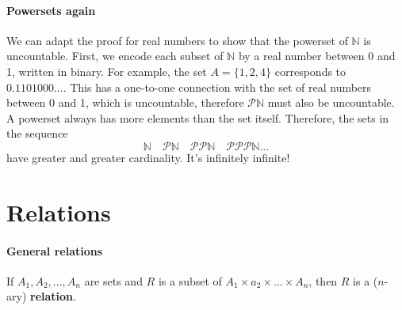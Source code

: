 \documentclass{article}
\begin{document}
\paragraph{Powersets again} We can adapt the proof for real numbers to show that the powerset of $\mathbb{N}$ is uncountable. First, we encode each subset of $\mathbb{N}$ by a real number between 0 and 1, written in binary. For example, the set $A=\{1,2,4\}$ corresponds to $0.1101000...$. This has a one-to-one connection with the set of real numbers between 0 and 1, which is uncountable, therefore $\mathscr{P}\mathbb{N}$ must also be uncountable.
\vspace{1mm}\\
A powerset always has more elements than the set itself. Therefore, the sets in the sequence
$$\mathbb{N}\quad \mathscr{P}\mathbb{N}\quad \mathscr{PP}\mathbb{N}\quad \mathscr{PPP}\mathbb{N}...$$
have greater and greater cardinality. It's infinitely infinite!

\section{Relations}
\paragraph{General relations} If $A_1,A_2,...,A_n$ are sets and $R$ is a subset of $A_1\times a_2\times ...\times A_n$, then $R$ is a ($n$-ary) \textbf{relation}.
\end{document}
